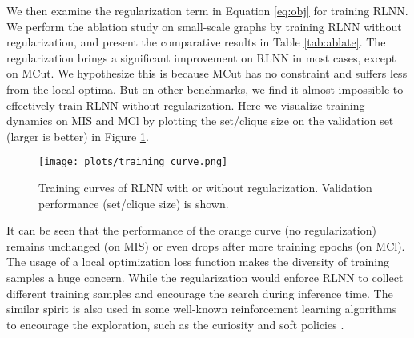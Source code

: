 We then examine the regularization term in Equation \ref{eq:obj} for training RLNN. We perform the ablation study on  small-scale graphs by training RLNN without regularization, and present the comparative results in Table \ref{tab:ablate}. The regularization brings a significant improvement on RLNN in most cases, except on MCut. We hypothesize this is because MCut has no constraint and suffers less from the local optima. But on other benchmarks, we find it almost impossible to effectively train RLNN without regularization. Here we visualize training dynamics on MIS and MCl by plotting the set/clique size on the validation set (larger is better) in Figure \ref{fig:training}.  
\begin{figure}
    \centering
    \texttt{[image: plots/training\_curve.png]}
    \caption{Training curves of  RLNN with or without regularization. Validation performance  (set/clique size) is shown.}
    \label{fig:training}
    \vspace{-5pt}
\end{figure}
It can be seen that the performance of the orange curve (no regularization) remains unchanged (on MIS) or even drops after more training epochs (on MCl). The usage of a local optimization loss function makes the diversity of training samples a huge concern. While the regularization would enforce RLNN to collect different training samples and encourage the search during inference time. The similar spirit is also used in some well-known reinforcement learning algorithms to encourage the exploration, such as the  curiosity \citep{pathakICMl17curiosity} and soft policies \citep{haarnoja2017reinforcement, pmlr-v80-haarnoja18b}. 